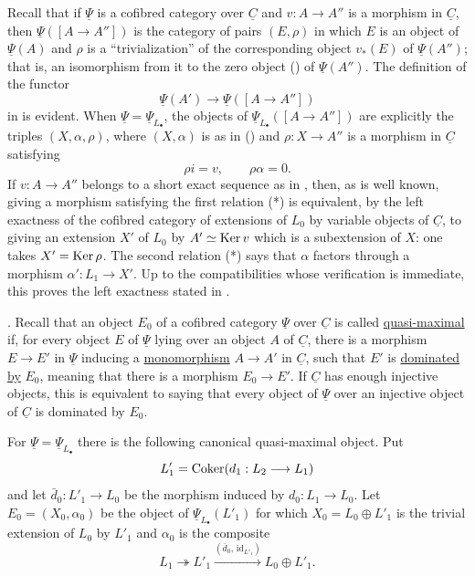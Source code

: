Recall that if $\underline\Psi$ is a cofibred category over
$\underline C$ and $v:A\longrightarrow A''$ is a morphism in
$\underline C$, then $\underline\Psi([A\longrightarrow A''])$ is the
category of pairs $(E,\rho)$ in which $E$ is an object of
$\underline\Psi(A)$ and $\rho$ is a ``trivialization'' of the
corresponding object $v_*(E)$ of $\underline\Psi(A'')$; that is, an
isomorphism from it to the zero object () of
$\underline\Psi(A'')$. The definition of the functor
\[
 \underline\Psi(A')\longrightarrow
 \underline\Psi([A\longrightarrow A''])
\]
in  is evident. When
$\underline\Psi=\underline\Psi_{L_\bullet}$, the objects of
$\underline\Psi_{L_\bullet}([A\longrightarrow A''])$ are explicitly
the triples $(X,\alpha,\rho)$, where $(X,\alpha)$ is as in ()
and $\rho:X\longrightarrow A''$ is a morphism in $\underline C$
satisfying
\begin{equation}\tag{*}
 \rho i=v,\qquad \rho\alpha=0.
\end{equation}
If $v:A\longrightarrow A''$ belongs to a short exact sequence as in
, then, as is well known, giving a morphism satisfying the
first relation (*) is equivalent, by the left exactness of the
cofibred category of extensions of $L_0$ by variable objects of
$\underline C$, to giving an extension $X'$ of $L_0$ by
$A'\simeq\operatorname{Ker} v$ which is a subextension of $X$: one takes
$X'=\operatorname{Ker}\rho$. The second relation (*) says that $\alpha$ factors
through a morphism $\alpha':L_1\longrightarrow X'$. Up to the
compatibilities whose verification is immediate, this proves the
left exactness stated in .

. Recall that an object $E_0$ of a cofibred category
$\underline\Psi$ over $\underline C$ is called \underline{quasi-maximal}
if, for every object $E$ of $\underline\Psi$ lying over an object
$A$ of $\underline C$, there is a morphism $E\longrightarrow E'$ in
$\underline\Psi$ inducing a \underline{monomorphism}
$A\longrightarrow A'$ in $\underline C$, such that $E'$ is
\underline{dominated by} $E_0$, meaning that there is a morphism
$E_0\longrightarrow E'$. If $\underline C$ has enough injective
objects, this is equivalent to saying that every object of
$\underline\Psi$ over an injective object of $\underline C$ is
dominated by $E_0$.

For $\underline\Psi=\underline\Psi_{L_\bullet}$ there is the
following canonical quasi-maximal object. Put
\[
 L'_1=\operatorname{Coker}(d_1:L_2\longrightarrow L_1)
\]
and let $\bar d_0:L'_1\longrightarrow L_0$ be the morphism induced
by $d_0:L_1\longrightarrow L_0$. Let $E_0=(X_0,\alpha_0)$ be the
object of $\underline\Psi_{L_\bullet}(L'_1)$ for which
$X_0=L_0\oplus L'_1$ is the trivial extension of $L_0$ by $L'_1$
and $\alpha_0$ is the composite
\[
 L_1\twoheadrightarrow L'_1
 \xrightarrow{(\bar d_0,\,\mathrm{id}_{L'_1})}
 L_0\oplus L'_1.
\]

